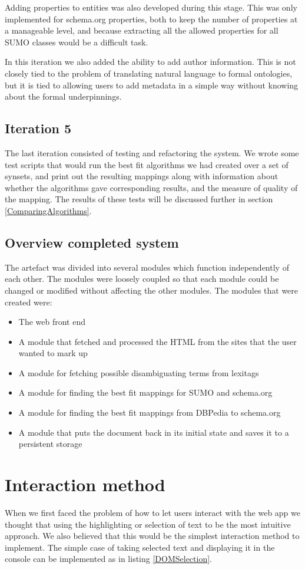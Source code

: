 Adding properties to entities was also developed during this stage.
This was only implemented for schema.org properties,
both to keep the number of properties at a manageable level,
and because extracting all the allowed properties for all SUMO classes would be a difficult task.

In this iteration we also added the ability to add author information.
This is not closely tied to the problem of translating natural language to formal ontologies,
but it is tied to allowing users to add metadata in a simple way without knowing about the formal underpinnings.

\subsection{Iteration 5}
The last iteration consisted of testing and refactoring the system.
We wrote some test scripts that would run the best fit algorithms we had created over a set of synsets,
and print out the resulting mappings along with information about whether the algorithms gave corresponding results,
and the measure of quality of the mapping.
The results of these tests will be discussed further in section \ref{ComparingAlgorithms}.

\subsection{Overview completed system}
The artefact was divided into several modules which function independently of each other.
The modules were loosely coupled so that each module could be changed or modified without affecting the other modules.
The modules that were created were:
\begin{itemize}
	\item The web front end
	\item A module that fetched and processed the HTML from the sites that the user wanted to mark up
	\item A module for fetching possible disambiguating terms from lexitags
	\item A module for finding the best fit mappings for SUMO and schema.org
	\item A module for finding the best fit mappings from DBPedia to schema.org
	\item A module that puts the document back in its initial state and saves it to a persistent storage
\end{itemize}

\section{Interaction method}
\label{Interaction}
When we first faced the problem of how to let users interact with the web app we thought that using the highlighting or
selection of text to be the most intuitive approach.
We also believed that this would be the simplest interaction method to implement.
The simple case of taking selected text and displaying it in the console can be implemented as in listing \ref{DOMSelection}.


